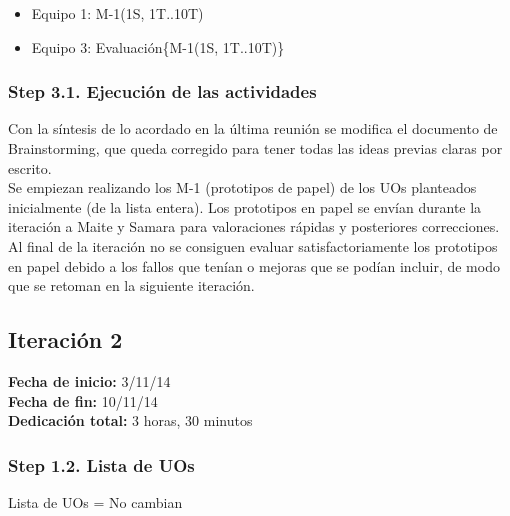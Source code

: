 \begin{itemize}
\item Equipo 1: M-1(1S, 1T..10T)
\item Equipo 3: Evaluación\{M-1(1S, 1T..10T)\}
\end{itemize}

\subsubsection{Step 3.1. Ejecución de las actividades}
\label{it1:3.1}

Con la síntesis de lo acordado en la última reunión se modifica el documento de Brainstorming, que queda corregido para tener todas las ideas previas claras por escrito.\\

Se empiezan realizando los M-1 (prototipos de papel) de los UOs planteados inicialmente (de la lista entera). Los prototipos en papel se envían durante la iteración a Maite y Samara para valoraciones rápidas y posteriores correcciones.\\

Al final de la iteración no se consiguen evaluar satisfactoriamente los prototipos en papel debido a los fallos que tenían o mejoras que se podían incluir, de modo que se retoman en la siguiente iteración.\\


\subsection{Iteración 2}
\label{it2}

\begin{flushleft}
\textbf{Fecha de inicio:} 3/11/14\\
\textbf{Fecha de fin:} 10/11/14\\
\textbf{Dedicación total:} 3 horas, 30 minutos\\
\end{flushleft}

\subsubsection{Step 1.2. Lista de UOs}
\label{it2:1.2}

Lista de UOs = No cambian

